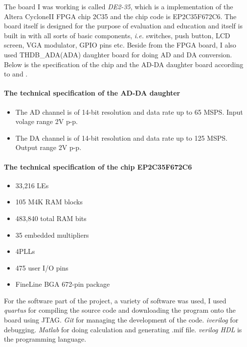 \documentclass[11pt]{scrartcl}
\begin{document}
The board I was working is called \textit{DE2-35}, which is a implementation of the Altera Cyclone\textregistered II FPGA chip 2C35 and the chip code is EP2C35F672C6. The board itself is designed for the purpose of evaluation and education and itself is built in with all sorts of basic components, \textit{i.e.} switches, push button, LCD screen, VGA modulator, GPIO pins etc. Beside from the FPGA board, I also used THDB\_ADA(ADA) daughter board for doing AD and DA conversion. Below is the specification of the chip and the AD-DA daughter board according to \cite{DE2UserManual} and \cite{addaman}.

\paragraph{The technical specification of the AD-DA daughter}

\begin{itemize}
    \item The AD channel is of 14-bit resolution and data rate up to 65 MSPS. Input volage range 2V p-p.
    \item The DA channel is of 14-bit resolution and data rate up to 125 MSPS. Output range 2V p-p.
\end{itemize}

\paragraph{The technical specification of the chip EP2C35F672C6 }
\begin{itemize}
    \item 33,216 LEs
    \item 105 M4K RAM blocks
    \item 483,840 total RAM bits
    \item 35 embedded multipliers
    \item 4PLLs
    \item 475 user I/O pins
    \item FineLine BGA 672-pin package
\end{itemize}

For the software part of the project, a variety of software was used, I used \textit{quartus} for compiling the source code and downloading the program onto the board using JTAG. \textit{Git} for managing the development of the code. \textit{iverilog} for debugging. \textit{Matlab} for doing calculation and generating .mif file. \textit{verilog HDL} is the programming language.\\
\end{document}
